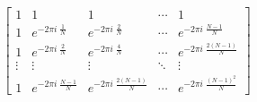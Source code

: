 \documentclass[preview]{standalone}
\begin{document}
\begin{align*}
\begin{bmatrix}1 & 1 & 1 & \cdots & 1\\1 & e^{-2\pi i\; \frac{1}{N}} & e^{-2\pi i\; \frac{2}{N}} & \cdots & e^{-2\pi i\; \frac{N-1}{N}}\\1 & e^{-2\pi i\; \frac{2}{N}} & e^{-2\pi i\; \frac{4}{N}} & \cdots & e^{-2\pi i\; \frac{2(N-1)}{N}}\\\vdots & \vdots & \vdots & \ddots & \vdots\\1 & e^{-2\pi i\; \frac{N-1}{N}} & e^{-2\pi i\; \frac{2(N-1)}{N}} & \cdots & e^{-2\pi i\; \frac{(N-1)^2}{N}}\end{bmatrix}
\end{align*}
\end{document}
